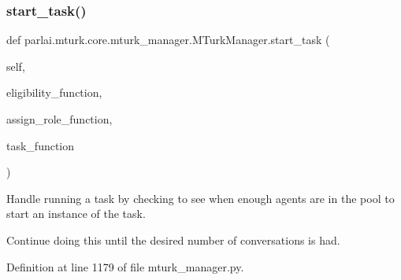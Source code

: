 \subsubsection{\texorpdfstring{start\+\_\+task()}{start\_task()}}
{\footnotesize\ttfamily def parlai.\+mturk.\+core.\+mturk\+\_\+manager.\+M\+Turk\+Manager.\+start\+\_\+task (\begin{DoxyParamCaption}\item[{}]{self,  }\item[{}]{eligibility\+\_\+function,  }\item[{}]{assign\+\_\+role\+\_\+function,  }\item[{}]{task\+\_\+function }\end{DoxyParamCaption})}

\begin{DoxyVerb}Handle running a task by checking to see when enough agents are in the pool to
start an instance of the task.

Continue doing this until the desired number of conversations is had.
\end{DoxyVerb}
 

Definition at line 1179 of file mturk\+\_\+manager.\+py.



